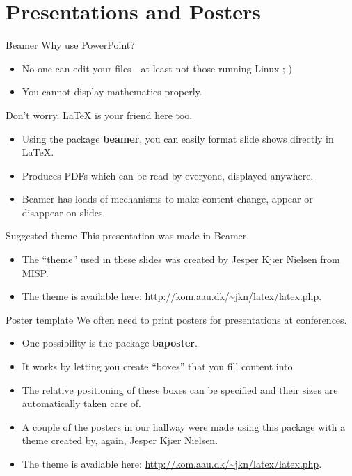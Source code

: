 \documentclass[english]{beamer}
\begin{document}

\section{Presentations and Posters}


\begin{frame}{\insertsection}{Beamer}
  Why use PowerPoint?
  \begin{itemize}
  \item No-one can edit your files---at least not those running
    Linux ;-)
  \item You cannot display mathematics properly.
  \end{itemize}
  Don't worry. \LaTeX{} is your friend here too.
  \begin{itemize}
  \item Using the package \textbf{beamer}, you can easily format slide
    shows directly in LaTeX.
  \item Produces PDFs which can be read by everyone, displayed anywhere.
  \item Beamer has loads of mechanisms to make content change, appear
    or disappear on slides.
  \end{itemize}
\end{frame}

\begin{frame}{\insertsection}{Suggested theme}
  This presentation was made in Beamer.
  \begin{itemize}
  \item The ``theme'' used in these slides was created by Jesper Kjær
    Nielsen from MISP.
  \item The theme is available here:
    \url{http://kom.aau.dk/~jkn/latex/latex.php}.
  \end{itemize}
\end{frame}


\begin{frame}{\insertsection}{Poster template}
  We often need to print posters for presentations at conferences.
  \begin{itemize}
  \item One possibility is the package \textbf{baposter}.
  \item It works by letting you create ``boxes'' that you fill content into.
  \item The relative positioning of these boxes can be specified and
    their sizes are automatically taken care of.
  \item A couple of the posters in our hallway were made using this
    package with a theme created by, again, Jesper Kjær Nielsen.
  \item The theme is available here:
    \url{http://kom.aau.dk/~jkn/latex/latex.php}.
  \end{itemize}
\end{frame}
\end{document}
